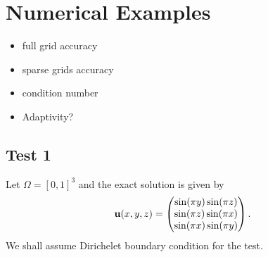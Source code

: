 \documentclass[final,leqno]{siamltex704}
\def\bu{{\bf u}}
\def\ljump{{[\![}}
\def\rjump{{]\!]}}
\def\lavg{{\{\!\{}}
\def\ravg{{\}\!\}}}
\begin{document}


\section{Numerical Examples}
\begin{itemize}
\item full grid accuracy
\item sparse grids accuracy
\item condition number
\item Adaptivity?
\end{itemize}
\subsection{Test 1}
Let $\Omega=[0,1]^3$ and the exact solution is given by
\begin{eqnarray}
\bu(x,y,z)=\begin{pmatrix}
\sin(\pi y)\sin(\pi z)\\
\sin(\pi z)\sin(\pi x)\\
\sin(\pi x)\sin(\pi y)
\end{pmatrix}.
\end{eqnarray}
We shall assume Dirichelet boundary condition for the test.
\end{document}
